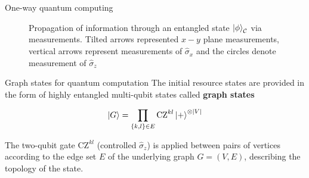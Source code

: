 \documentclass[final]{beamer}
\newlength{\colwidth}
\begin{document}
\begin{frame}[t]
\begin{columns}[t]
\begin{column}{\colwidth}
\begin{block}{One-way quantum computing}
\begin{figure}[H]
\begin{tikzpicture}
                        \end{tikzpicture}
                        \caption{Propagation of information through an entangled state
                            $\ket{\phi}_{\mathcal{C}}$ via measurements. Tilted
                            arrows represented $x-y$ plane measurements, vertical arrows represent
                            measurements of $\hat{\sigma}_x$ and the circles denote measurement of
                        $\hat{\sigma}_z$}
                        \label{fig:information_propagation_through_a_cluster_state}
                    \end{figure}
                \end{block}

                \begin{block}{Graph states for quantum computation}
                    The initial resource states are provided in the form  of highly
                    entangled multi-qubit states called \textbf{graph states}

                    \begin{align}
                        \ket{G} = \displaystyle\prod_{\{k, l\} \in E}
                        \text{CZ}^{kl}\ket{+}^{\otimes |V|}
                        \label{eq:graph_state_preparation}
                    \end{align}

                    The two-qubit gate $\text{CZ}^{kl}$ (controlled
                    $\hat{\sigma}_z$) is applied between pairs of
                    vertices according to the edge set $E$ of the underlying graph
                    $G= (V, E)$, describing the topology of the state.


\end{block}
\end{column}
\end{columns}
\end{frame}
\end{document}
